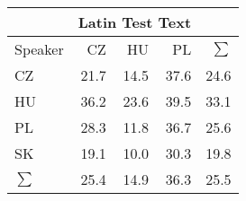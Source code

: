 \begin{tabular}{l|rrr|r}
\hline
 & \multicolumn{3}{c}{Latin Test Text} & \\
\hline
 Speaker   &   CZ &   HU &   PL &   $\sum$ \\
\hline
 CZ        & 21.7 & 14.5 & 37.6 &     24.6 \\
 HU        & 36.2 & 23.6 & 39.5 &     33.1 \\
 PL        & 28.3 & 11.8 & 36.7 &     25.6 \\
 SK        & 19.1 & 10.0 & 30.3 &     19.8 \\
\hline
 $\sum$   & 25.4 & 14.9 & 36.3 &     25.5 \\
\hline
\end{tabular}
